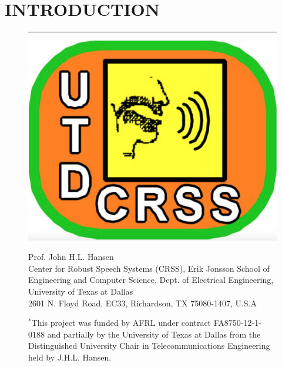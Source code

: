 
\section{INTRODUCTION}
\label{sec:intro}

\begin{figure}[b]
\hrule
\vspace{.03cm}
{}
\begin{minipage}{0.2\linewidth}
\centering
\includegraphics[width=0.5\linewidth]{figures/CRSS_logo}
\end{minipage}
\begin{minipage}{0.8\linewidth}
\begin{singlespace}
\small \vspace{.5cm}
\footnotesize
Prof. John H.L. Hansen\\
Center for Robust Speech Systems (CRSS), Erik Jonsson School of Engineering and Computer Science, Dept. of
Electrical Engineering, University of Texas at Dallas\\
2601 N. Floyd Road, EC33, Richardson, TX 75080-1407, U.S.A\\
\end{singlespace}
\end{minipage}
\small{$^*$This project was funded by AFRL under contract FA8750-12-1-0188 and partially by the University of Texas at Dallas from the Distinguished University Chair in Telecommunications Engineering held by J.H.L. Hansen.}\\
\end{figure}


